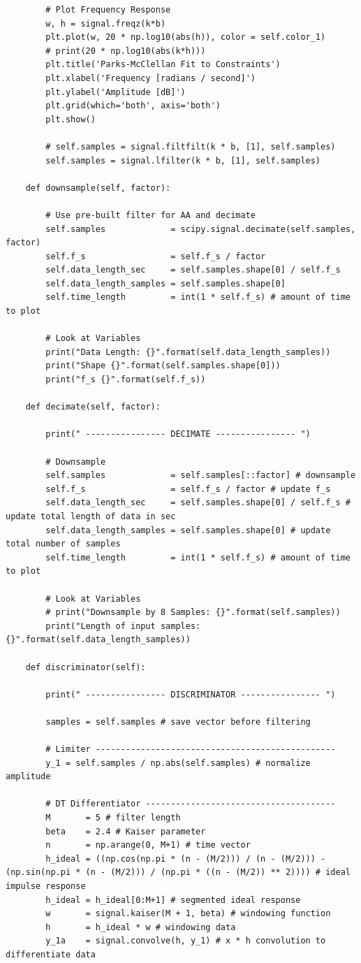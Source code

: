 \documentclass{article}
\begin{document}
\begin{lstlisting}
		# Plot Frequency Response
		w, h = signal.freqz(k*b)
		plt.plot(w, 20 * np.log10(abs(h)), color = self.color_1)
		# print(20 * np.log10(abs(k*h)))
		plt.title('Parks-McClellan Fit to Constraints')
		plt.xlabel('Frequency [radians / second]')
		plt.ylabel('Amplitude [dB]')
		plt.grid(which='both', axis='both')
		plt.show()

		# self.samples = signal.filtfilt(k * b, [1], self.samples)
		self.samples = signal.lfilter(k * b, [1], self.samples)

	def downsample(self, factor):

		# Use pre-built filter for AA and decimate
		self.samples             = scipy.signal.decimate(self.samples, factor)
		self.f_s                 = self.f_s / factor
		self.data_length_sec     = self.samples.shape[0] / self.f_s
		self.data_length_samples = self.samples.shape[0]
		self.time_length         = int(1 * self.f_s) # amount of time to plot

		# Look at Variables
		print("Data Length: {}".format(self.data_length_samples))
		print("Shape {}".format(self.samples.shape[0]))
		print("f_s {}".format(self.f_s))

	def decimate(self, factor):

		print(" ---------------- DECIMATE ---------------- ")

        # Downsample
		self.samples             = self.samples[::factor] # downsample
		self.f_s                 = self.f_s / factor # update f_s
		self.data_length_sec     = self.samples.shape[0] / self.f_s # update total length of data in sec
		self.data_length_samples = self.samples.shape[0] # update total number of samples
		self.time_length         = int(1 * self.f_s) # amount of time to plot

		# Look at Variables
		# print("Downsample by 8 Samples: {}".format(self.samples))
		print("Length of input samples: {}".format(self.data_length_samples))

	def discriminator(self):

		print(" ---------------- DISCRIMINATOR ---------------- ")

		samples = self.samples # save vector before filtering

		# Limiter ------------------------------------------------
		y_1 = self.samples / np.abs(self.samples) # normalize amplitude

		# DT Differentiator --------------------------------------
		M       = 5 # filter length
		beta    = 2.4 # Kaiser parameter
		n       = np.arange(0, M+1) # time vector
		h_ideal = ((np.cos(np.pi * (n - (M/2))) / (n - (M/2))) - (np.sin(np.pi * (n - (M/2))) / (np.pi * ((n - (M/2)) ** 2)))) # ideal impulse response
		h_ideal = h_ideal[0:M+1] # segmented ideal response
		w       = signal.kaiser(M + 1, beta) # windowing function
		h       = h_ideal * w # windowing data
		y_1a    = signal.convolve(h, y_1) # x * h convolution to differentiate data


\end{lstlisting}
\end{document}

